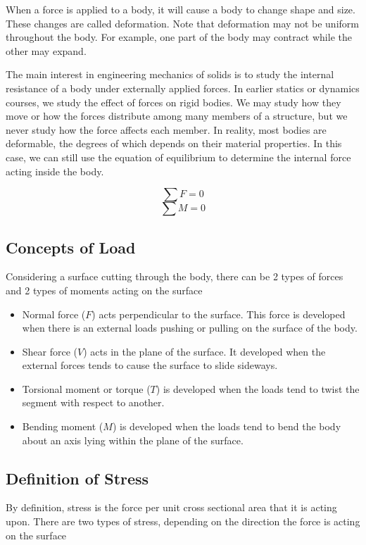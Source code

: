 \documentclass[a4paper,openany,12pt]{book}
\begin{document}
When a force is applied to a body, it will cause a body to change shape
and size. These changes are called deformation. Note that deformation
may not be uniform throughout the body. For example, one part of the
body may contract while the other may expand.

The main interest in engineering mechanics of solids is to study the
internal resistance of a body under externally applied forces. In
earlier statics or dynamics courses, we study the effect of forces on
rigid bodies. We may study how they move or how the forces distribute
among many members of a structure, but we never study how the force
affects each member. In reality, most bodies are deformable, the degrees
of which depends on their material properties. In this case, we can
still use the equation of equilibrium to determine the internal force
acting inside the body.

$$\sum F = 0$$ $$\sum M = 0$$

\subsection{Concepts of Load}
\label{concepts-of-load}
Considering a surface cutting through the body, there can be 2 types of
forces and 2 types of moments acting on the surface

\begin{itemize}
\item Normal force (\(F\)) acts perpendicular to the surface. This force is
developed when there is an external loads pushing or pulling on the
surface of the body.

\item Shear force (\(V\)) acts in the plane of the surface. It developed when
the external forces tends to cause the surface to slide sideways.

\item Torsional moment or torque (\(T\)) is developed when the loads tend to
twist the segment with respect to another.

\item Bending moment (\(M\)) is developed when the loads tend to bend the body
about an axis lying within the plane of the surface.
\end{itemize}

\subsection{Definition of Stress}
\label{definition-of-stress}
By definition, stress is the force per unit cross sectional area that it
is acting upon. There are two types of stress, depending on the
direction the force is acting on the surface
\end{document}
